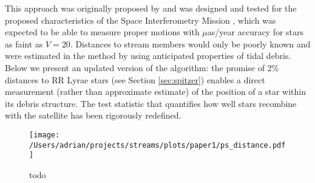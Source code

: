 \documentclass[preprint]{aastex}
\begin{document}
This approach was originally proposed by \citep{johnston99a} and was designed and tested for the proposed characteristics of the Space Interferometry Mission \citep{unwin??}, which was expected to be able to measure proper motions with $\mu$as/year accuracy for stars as faint as $V=20$. Distances to stream members would only be poorly known and were estimated in the method by using anticipated properties of tidal debris. Below we present an updated version of the algorithm: the promise of 2\% distances to RR Lyrae stars (see Section \ref{sec:spitzer}) enables a direct measurement (rather than approximate estimate) of the position of a star within its debris structure. The test statistic that quantifies how well stars recombine with the satellite has been rigorously redefined.

\begin{figure}[h]
\begin{center}
\texttt{[image: /Users/adrian/projects/streams/plots/paper1/ps\_distance.pdf]}
\caption{ todo }\label{fig:ps_distance}
\end{center}
\end{figure}
\end{document}
